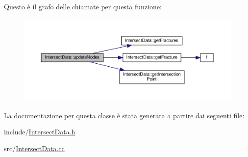 Questo è il grafo delle chiamate per questa funzione\-:
\nopagebreak
\begin{figure}[H]
\begin{center}
\leavevmode
\includegraphics[width=350pt]{classIntersectData_a6bcd52066286893ea1f7c36ea841da82_cgraph}
\end{center}
\end{figure}




La documentazione per questa classe è stata generata a partire dai seguenti file\-:\begin{DoxyCompactItemize}
\item 
include/\hyperlink{IntersectData_8h}{Intersect\-Data.\-h}\item 
src/\hyperlink{IntersectData_8cc}{Intersect\-Data.\-cc}\end{DoxyCompactItemize}
